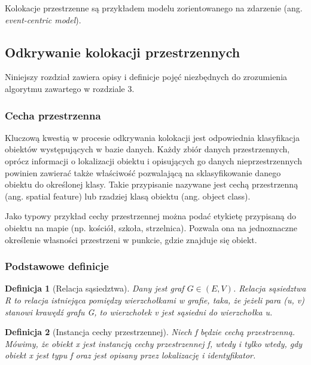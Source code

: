 \documentclass[12pt]{article}
\newtheorem{defin}{Definicja}
\begin{document}
Kolokacje przestrzenne są przykładem modelu zorientowanego na zdarzenie (ang. \textit{event-centric model}).

\subsection{Odkrywanie kolokacji przestrzennych}

Niniejszy rozdział zawiera opisy i definicje pojęć niezbędnych do zrozumienia algorytmu zawartego w rozdziale 3.

\subsubsection{Cecha przestrzenna}

Kluczową kwestią w procesie odkrywania kolokacji jest odpowiednia klasyfikacja obiektów występujących w bazie danych. Każdy zbiór danych przestrzennych, oprócz informacji o lokalizacji obiektu i opisujących go danych nieprzestrzennych powinien zawierać także właściwość pozwalającą na sklasyfikowanie danego obiektu do określonej klasy. Takie przypisanie nazywane jest cechą przestrzenną (ang. spatial feature) lub rzadziej klasą obiektu (ang. object class).

Jako typowy przykład cechy przestrzennej można podać etykietę przypisaną do obiektu na mapie (np. kościół, szkoła, strzelnica). Pozwala ona na jednoznaczne określenie własności przestrzeni w punkcie, gdzie znajduje się obiekt.

\subsubsection{Podstawowe definicje}

\begin{defin}[Relacja sąsiedztwa]
Dany jest graf $ G \in (E, V) $. Relacja sąsiedztwa R to relacja istniejąca pomiędzy wierzchołkami w grafie, taka, że jeżeli para (u, v) stanowi krawędź grafu G, to wierzchołek v jest sąsiedni do wierzchołka u.
\end{defin}

\begin{defin}[Instancja cechy przestrzennej]
Niech f będzie cechą przestrzenną. Mówimy, że obiekt x jest instancją cechy przestrzennej f, wtedy i tylko wtedy, gdy obiekt x jest typu f oraz jest opisany przez lokalizację i identyfikator.
\end{defin}
\end{document}
